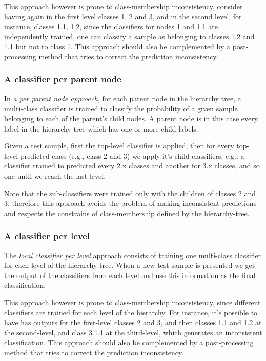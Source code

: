 \documentclass[11pt,a4paper]{article}
\begin{document}
This approach however is prone to class-membership inconsistency, consider having again in the first
level classes 1, 2 and 3, and in the second level, for instance, classes 1.1, 1.2, since the
classifiers for nodes 1 and 1.1 are independently trained, one can classify a sample as belonging to
classes 1.2 and 1.1 but not to class 1. This approach should also be complemented by a
post-processing method that tries to correct the prediction inconsistency.


\subsubsection{A classifier per parent node} %
In \textit{a per parent node approach}, for each parent node in the hierarchy tree, a multi-class
classifier is trained to classify the probability of a given sample belonging to each of the parent's
child nodes. A parent node is in this case every label in the hierarchy-tree which has one or more
child labels.

Given a test sample, first the top-level classifier is applied, then for every top-level
predicted class (e.g., class 2 and 3) we apply it's child classifiers, e.g.: a classifier
trained to predicted every 2.x classes and another for 3.x classes, and so one until we reach the
last level.

Note that the sub-classifiers were trained only with the children of classes 2 and 3, therefore
this approach avoids the problem of making inconsistent predictions and respects the constrains
of class-membership defined by the hierarchy-tree.


\subsubsection{A classifier per level} %
The \textit{local classifier per level} approach consists of training one multi-class classifier
for each level of the hierarchy-tree. When a new test sample is presented we get the output of the
classifiers from each level and use this information as the final classification.

This approach however is prone to class-membership inconsistency, since different classifiers are
trained for each level of the hierarchy. For instance, it's possible to have has outputs for the
first-level classes 2 and 3, and then classes 1.1 and 1.2 at the second-level, and class 3.1.1
at the third-level, which generates an inconsistent classification. This approach should also
be complemented by a post-processing method that tries to correct the prediction inconsistency.
\end{document}
